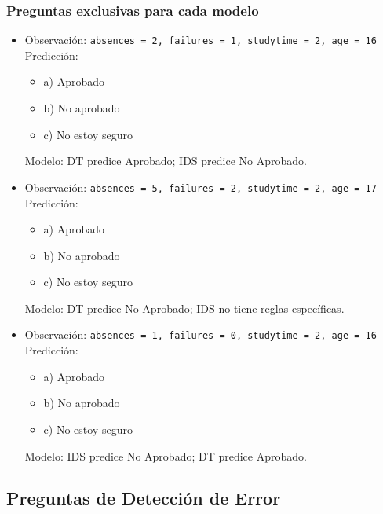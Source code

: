 \subsubsection*{Preguntas exclusivas para cada modelo}
\begin{itemize}
    \item Observación: \texttt{absences = 2, failures = 1, studytime = 2, age = 16}\\
    Predicción:
    \begin{itemize}
        \item a) Aprobado
        \item b) No aprobado
        \item c) No estoy seguro
    \end{itemize}
    Modelo: DT predice Aprobado; IDS predice No Aprobado.

    \item Observación: \texttt{absences = 5, failures = 2, studytime = 2, age = 17}\\
    Predicción:
    \begin{itemize}
        \item a) Aprobado
        \item b) No aprobado
        \item c) No estoy seguro
    \end{itemize}
    Modelo: DT predice No Aprobado; IDS no tiene reglas específicas.

    \item Observación: \texttt{absences = 1, failures = 0, studytime = 2, age = 16}\\
    Predicción:
    \begin{itemize}
        \item a) Aprobado
        \item b) No aprobado
        \item c) No estoy seguro
    \end{itemize}
    Modelo: IDS predice No Aprobado; DT predice Aprobado.
\end{itemize}

\subsection*{Preguntas de Detección de Error}


